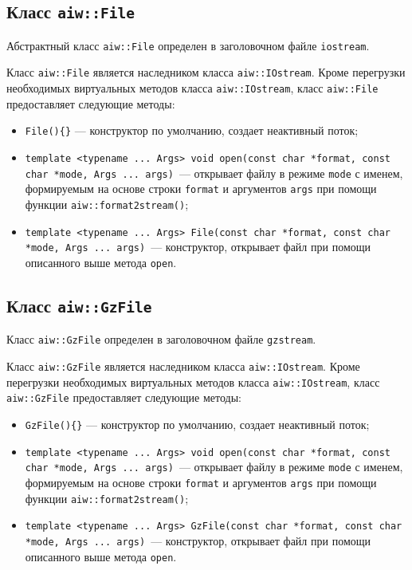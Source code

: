 \subsection{Класс {\tt aiw::File}}
Абстрактный класс \verb'aiw::File' определен в заголовочном файле \verb'iostream'.

Класс \verb'aiw::File' является наследником класса \verb'aiw::IOstream'. Кроме перегрузки необходимых
виртуальных методов класса \verb'aiw::IOstream', класс \verb'aiw::File' предоставляет следующие методы:
\begin{itemize}
\item \verb'File(){}' --- конструктор по умолчанию, создает неактивный поток;
\item \verb'template <typename ... Args> void open(const char *format, const char *mode, Args ... args)'~---
  открывает файлу в режиме \verb'mode' с именем, формируемым на основе строки \verb'format' и аргументов \verb'args'
  при помощи функции  \verb'aiw::format2stream()';
\item \verb'template <typename ... Args> File(const char *format, const char *mode, Args ... args)'~---
  конструктор, открывает файл при помощи описанного выше метода \verb'open'.
\end{itemize}

\subsection{Класс {\tt aiw::GzFile}}
Класс \verb'aiw::GzFile' определен в заголовочном файле \verb'gzstream'.

Класс \verb'aiw::GzFile' является наследником класса \verb'aiw::IOstream'. Кроме перегрузки необходимых
виртуальных методов класса \verb'aiw::IOstream', класс \verb'aiw::GzFile' предоставляет следующие методы:
\begin{itemize}
\item \verb'GzFile(){}' --- конструктор по умолчанию, создает неактивный поток;
\item \verb'template <typename ... Args> void open(const char *format, const char *mode, Args ... args)'~---
  открывает файлу в режиме \verb'mode' с именем, формируемым на основе строки \verb'format' и аргументов \verb'args'
  при помощи функции  \verb'aiw::format2stream()';
\item \verb'template <typename ... Args> GzFile(const char *format, const char *mode, Args ... args)'~---
  конструктор, открывает файл при помощи описанного выше метода \verb'open'.
\end{itemize}

